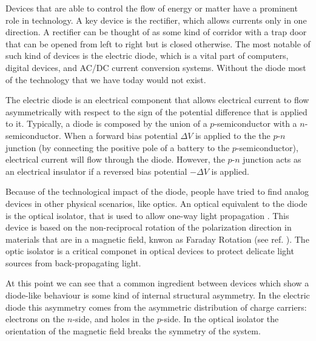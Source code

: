 
\label{Introduction}

Devices that are able to control the flow of energy or matter have a prominent role in technology. A key device is the rectifier, which allows currents only in one direction. A rectifier can be thought of as some kind of corridor with a trap door that can be opened from left to right but is closed otherwise. The most notable of such kind of devices is the electric diode, which is a vital part of computers, digital devices, and AC/DC current conversion systems. Without the diode most of the technology that we have today would not exist.

The electric diode is an electrical component that allows electrical current to flow asymmetrically with respect to the sign of the potential difference that is applied to it. Typically, a diode is composed by the union of a $p$-semiconductor with a $n$-semiconductor. When a forward bias potential $\Delta V$ is applied to the the $p$-$n$ junction (by connecting the positive pole of a battery to the $p$-semiconductor), electrical current will flow through the diode. However, the $p$-$n$ junction acts as an electrical insulator if a reversed bias potential $-\Delta V$ is applied.

Because of the technological impact of the diode, people have tried to find analog devices in other physical scenarios, like optics. An optical equivalent to the diode is the optical isolator, that is used to allow one-way light propagation \cite{Saleh1991}. This device is based on the non-reciprocal rotation of the polarization direction in materials that are in a magnetic field, knwon as Faraday Rotation (see ref. \cite{Yariv1984}). The optic isolator is a critical componet in optical devices to protect delicate light sources from back-propagating light.

At this point we can see that a common ingredient between devices which show a diode-like behaviour is some kind of internal structural asymmetry. In the electric diode this asymmetry comes from the asymmetric distribution of charge carriers: electrons on the $n$-side, and holes in the $p$-side. In the optical isolator the orientation of the magnetic field breaks the symmetry of the system.


